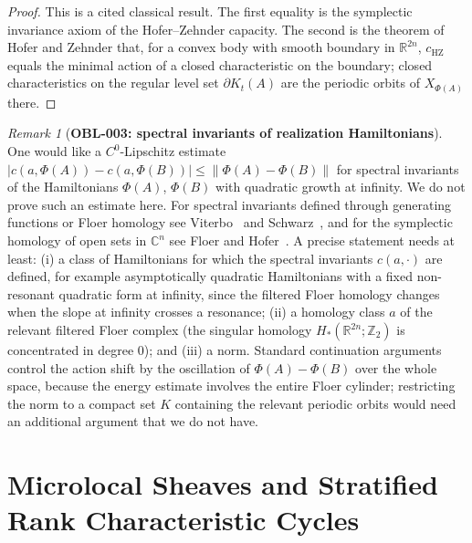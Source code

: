 \documentclass[11pt,a4paper,reqno]{amsart}
\theoremstyle{definition}
\theoremstyle{remark}
\newtheorem{remark}[theorem]{Remark}
\numberwithin{equation}{section}
\begin{document}
\begin{proof}
This is a cited classical result. The first equality is the symplectic invariance axiom of the Hofer--Zehnder capacity. The second is the theorem of Hofer and Zehnder \cite{HoferZehnder1994} that, for a convex body with smooth boundary in $\mathbb{R}^{2n}$, $c_{\mathrm{HZ}}$ equals the minimal action of a closed characteristic on the boundary; closed characteristics on the regular level set $\partial K_t(A)$ are the periodic orbits of $X_{\Phi(A)}$ there.
\end{proof}

\begin{remark}[\textbf{OBL-003: spectral invariants of realization Hamiltonians}]
\label{rem:viterbo_lipschitz}
One would like a $C^0$-Lipschitz estimate $\lvert c(a, \Phi(A)) - c(a, \Phi(B))\rvert \le \lVert\Phi(A) - \Phi(B)\rVert$ for spectral invariants of the Hamiltonians $\Phi(A)$, $\Phi(B)$ with quadratic growth at infinity. We do not prove such an estimate here. For spectral invariants defined through generating functions or Floer homology see Viterbo~\cite{Viterbo1992} and Schwarz~\cite{Schwarz2000}, and for the symplectic homology of open sets in $\mathbb{C}^n$ see Floer and Hofer~\cite{FloerHofer1994}. A precise statement needs at least: (i) a class of Hamiltonians for which the spectral invariants $c(a,\cdot)$ are defined, for example asymptotically quadratic Hamiltonians with a fixed non-resonant quadratic form at infinity, since the filtered Floer homology changes when the slope at infinity crosses a resonance; (ii) a homology class $a$ of the relevant filtered Floer complex (the singular homology $H_*(\mathbb{R}^{2n};\mathbb{Z}_2)$ is concentrated in degree $0$); and (iii) a norm. Standard continuation arguments control the action shift by the oscillation of $\Phi(A) - \Phi(B)$ over the whole space, because the energy estimate involves the entire Floer cylinder; restricting the norm to a compact set $K$ containing the relevant periodic orbits would need an additional argument that we do not have.
\end{remark}

\section{Microlocal Sheaves and Stratified Rank Characteristic Cycles}
\label{sec:microlocal}
\end{document}

